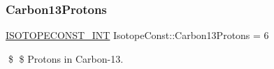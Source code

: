 \subsubsection{\texorpdfstring{Carbon13\+Protons}{Carbon13Protons}}
{\footnotesize\ttfamily \mbox{\hyperlink{group___isotope_const-_macros_ga5f18360b3e99483a35c32d789e62621c}{I\+S\+O\+T\+O\+P\+E\+C\+O\+N\+S\+T\+\_\+\+I\+NT}} Isotope\+Const\+::\+Carbon13\+Protons = 6}

\$ \$ Protons in Carbon-\/13. 